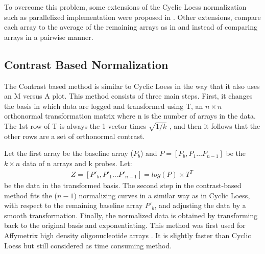 To overcome this problem, some extensions of the Cyclic Loess normalization such as parallelized implementation were proposed in \cite{ballman}. Other extensions, compare each array to the average of the remaining arrays as in \cite{edwards} and \cite{ballman} instead of comparing arrays in a pairwise manner.

\subsection{ Contrast Based Normalization}
The Contrast based method \cite{astrand:eke} is similar to Cyclic Loess in the way that it also uses an M versus A plot. This method consists of three main steps. First, it changes the basis in which data are logged and transformed using T, an $n \times n$ orthonormal transformation matrix where n is the number of arrays in the data. The 1st row of T is always the 1-vector times $ \sqrt{1/k} $ , and then it follows that the other rows are a set of orthonormal contrast.

Let the first array be the baseline array ($P_b$) and 
$ P= [P_b , P_1 \ldots P_{n-1}] $ be the $k \times n$ data of n arrays and k probes. Let: \\
\begin{eqnarray}
Z= [ P'_b , P'_1 \ldots P'_{n-1}] = log (P) \times T^T \ 
\end{eqnarray} 
be the data in the transformed basis.
The second step in the contrast-based method fits the ($n-1$) normalizing curves in a similar way as in Cyclic Loess, with respect to the remaining baseline array $ P'_b$, and adjusting the data by a smooth transformation. Finally, the normalized data is obtained by transforming back to the original basis and exponentiating. This method was first used for Affymetrix high density oligonucleotide arrays \cite{astrand:eke}. It is slightly faster than Cyclic Loess but still considered as time consuming method.\\